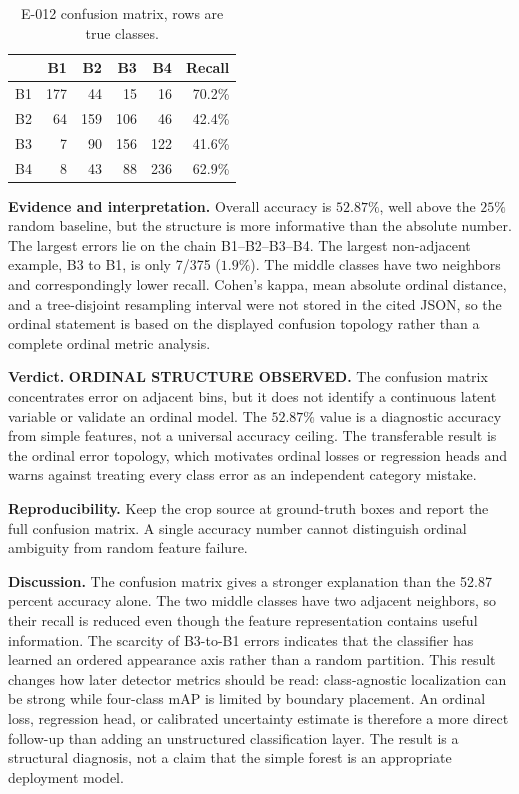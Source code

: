 \documentclass[preprint,12pt]{elsarticle}
\begin{document}
\begin{table}[H]
\centering
\caption{E-012 confusion matrix, rows are true classes.}
\label{tab:e012}
\begin{tabular}{lrrrr|r}
\toprule
 & B1 & B2 & B3 & B4 & Recall\\
\midrule
B1 & 177 & 44 & 15 & 16 & 70.2\%\\
B2 & 64 & 159 & 106 & 46 & 42.4\%\\
B3 & 7 & 90 & 156 & 122 & 41.6\%\\
B4 & 8 & 43 & 88 & 236 & 62.9\%\\
\bottomrule
\end{tabular}
\end{table}

\textbf{Evidence and interpretation.} Overall accuracy is \(52.87\%\), well
above the \(25\%\) random baseline, but the structure is more informative
than the absolute number. The largest errors lie on the chain
B1--B2--B3--B4. The largest non-adjacent example, B3 to B1, is only
7/375 (\(1.9\%\)). The middle classes have two neighbors and correspondingly
lower recall. Cohen's kappa, mean absolute ordinal distance, and a
tree-disjoint resampling interval were not stored in the cited JSON, so the
ordinal statement is based on the displayed confusion topology rather than a
complete ordinal metric analysis.

\textbf{Verdict.} \textbf{ORDINAL STRUCTURE OBSERVED.} The confusion matrix
concentrates error on adjacent bins, but it does not identify a continuous
latent variable or validate an ordinal model. The \(52.87\%\) value is a
diagnostic accuracy from simple features, not a universal accuracy ceiling.
The transferable result is the ordinal error topology, which motivates
ordinal losses or regression heads and warns against treating every class
error as an independent category mistake.

\textbf{Reproducibility.} Keep the crop source at ground-truth boxes and
report the full confusion matrix. A single accuracy number cannot distinguish
ordinal ambiguity from random feature failure.

\textbf{Discussion.} The confusion matrix gives a stronger explanation than
the 52.87 percent accuracy alone. The two middle classes have two adjacent
neighbors, so their recall is reduced even though the feature representation
contains useful information. The scarcity of B3-to-B1 errors indicates that
the classifier has learned an ordered appearance axis rather than a random
partition. This result changes how later detector metrics should be read:
class-agnostic localization can be strong while four-class mAP is limited by
boundary placement. An ordinal loss, regression head, or calibrated
uncertainty estimate is therefore a more direct follow-up than adding an
unstructured classification layer. The result is a structural diagnosis, not
a claim that the simple forest is an appropriate deployment model.
\end{document}
